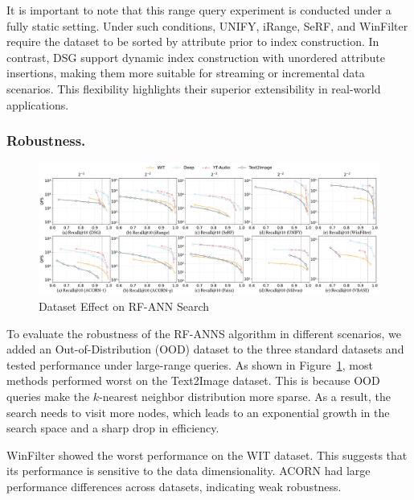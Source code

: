 \documentclass[sigconf, nonacm]{acmart}
\begin{document}
	
	
	
	It is important to note that this range query experiment is conducted under a fully static setting. Under such conditions, UNIFY, iRange, SeRF, and WinFilter require the dataset to be sorted by attribute prior to index construction. In contrast, DSG  support dynamic index construction with unordered attribute insertions, making them more suitable for streaming or incremental data scenarios. This flexibility highlights their superior extensibility in real-world applications.
	\subsubsection{Robustness.}
	
	\begin{figure}[htbp]
		\centering
		\includegraphics[width=\textwidth]{figures/exp/exp_8_3.pdf}
		\caption{Dataset Effect on RF-ANN Search}
		\label{fig:exp_8_3}
	\end{figure}
	
To evaluate the robustness of the RF-ANNS algorithm in different scenarios, we added an Out-of-Distribution (OOD) dataset to the three standard datasets and tested performance under large-range queries. As shown in Figure~\ref{fig:exp_8_3}, most methods performed worst on the Text2Image dataset. This is because OOD queries make the $k$-nearest neighbor distribution more sparse. As a result, the search needs to visit more nodes, which leads to an exponential growth in the search space and a sharp drop in efficiency.

WinFilter showed the worst performance on the WIT dataset. This suggests that its performance is sensitive to the data dimensionality. ACORN had large performance differences across datasets, indicating weak robustness.
\end{document}
